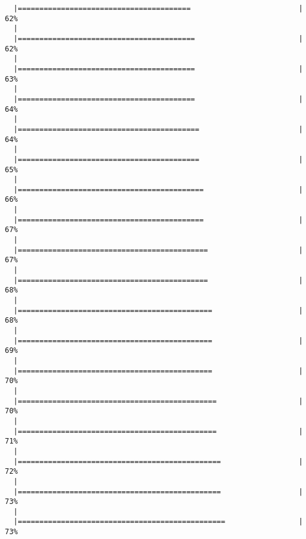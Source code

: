 \begin{knitrout}
\begin{kframe}
\begin{verbatim}
  |========================================                         |  62%
  |                                                                       
  |=========================================                        |  62%
  |                                                                       
  |=========================================                        |  63%
  |                                                                       
  |=========================================                        |  64%
  |                                                                       
  |==========================================                       |  64%
  |                                                                       
  |==========================================                       |  65%
  |                                                                       
  |===========================================                      |  66%
  |                                                                       
  |===========================================                      |  67%
  |                                                                       
  |============================================                     |  67%
  |                                                                       
  |============================================                     |  68%
  |                                                                       
  |=============================================                    |  68%
  |                                                                       
  |=============================================                    |  69%
  |                                                                       
  |=============================================                    |  70%
  |                                                                       
  |==============================================                   |  70%
  |                                                                       
  |==============================================                   |  71%
  |                                                                       
  |===============================================                  |  72%
  |                                                                       
  |===============================================                  |  73%
  |                                                                       
  |================================================                 |  73%

\end{verbatim}
\end{kframe}
\end{knitrout}
